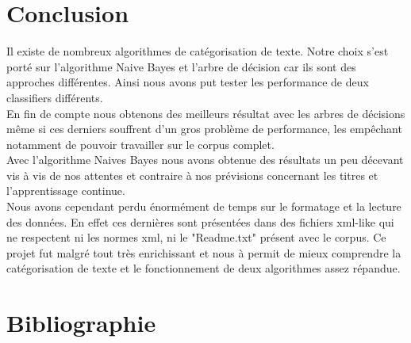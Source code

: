 \section*{Conclusion}

Il existe de nombreux algorithmes de catégorisation de texte. Notre choix s'est porté sur l'algorithme Naive Bayes et l'arbre de décision car ils sont des approches différentes. Ainsi nous avons put tester les performance de deux classifiers différents.\\
En fin de compte nous obtenons des meilleurs résultat avec les arbres de décisions même si ces derniers souffrent d'un gros problème de performance, les empêchant notamment de pouvoir travailler sur le corpus complet.\\
Avec l'algorithme Naives Bayes nous avons obtenue des résultats un peu décevant vis à vis de nos attentes et contraire à nos prévisions concernant les titres et l'apprentissage continue.\\
Nous avons cependant perdu énormément de temps sur le formatage et la lecture des données. En effet ces dernières sont présentées dans des fichiers xml-like qui ne respectent ni les normes xml, ni le "Readme.txt" présent avec le corpus. 
Ce projet fut malgré tout très enrichissant et nous à permit de mieux comprendre la catégorisation de texte et le fonctionnement de deux algorithmes assez répandue. \\
\newpage

\section*{Bibliographie}

\begin{thebibliography}{99}


\end{thebibliography}
